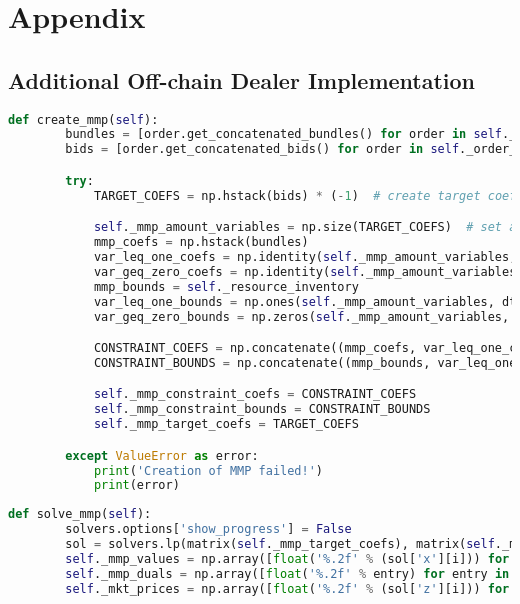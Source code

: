 \section{Appendix}

\subsection{Additional Off-chain Dealer Implementation}
\label{appendix:additional_offchain}

\begin{lstlisting}[float=htbp, label=lst:creation_mmp, caption=Creation of MMP, language=Python]
    def create_mmp(self):
        bundles = [order.get_concatenated_bundles() for order in self._order_handler.get_all_orders()]
        bids = [order.get_concatenated_bids() for order in self._order_handler.get_all_orders()]

        try:
            TARGET_COEFS = np.hstack(bids) * (-1)  # create target coef vector

            self._mmp_amount_variables = np.size(TARGET_COEFS)  # set amount of variables
            mmp_coefs = np.hstack(bundles)
            var_leq_one_coefs = np.identity(self._mmp_amount_variables, dtype=float)  # create constraint matrix for y<=1
            var_geq_zero_coefs = np.identity(self._mmp_amount_variables, dtype=float) * (-1)  # create constraint matrix for y>=0
            mmp_bounds = self._resource_inventory
            var_leq_one_bounds = np.ones(self._mmp_amount_variables, dtype=float)
            var_geq_zero_bounds = np.zeros(self._mmp_amount_variables, dtype=float)

            CONSTRAINT_COEFS = np.concatenate((mmp_coefs, var_leq_one_coefs, var_geq_zero_coefs), axis=0)  # create final constraint matrix
            CONSTRAINT_BOUNDS = np.concatenate((mmp_bounds, var_leq_one_bounds, var_geq_zero_bounds))  # create final bounds matrix

            self._mmp_constraint_coefs = CONSTRAINT_COEFS
            self._mmp_constraint_bounds = CONSTRAINT_BOUNDS
            self._mmp_target_coefs = TARGET_COEFS

        except ValueError as error:
            print('Creation of MMP failed!')
            print(error)
\end{lstlisting}

\begin{lstlisting}[float=htbp, label=lst:solving_mmp, caption=Solving of MMP, language=Python]
    def solve_mmp(self):
        solvers.options['show_progress'] = False
        sol = solvers.lp(matrix(self._mmp_target_coefs), matrix(self._mmp_constraint_coefs), matrix(self._mmp_constraint_bounds))
        self._mmp_values = np.array([float('%.2f' % (sol['x'][i])) for i in range(self._mmp_amount_variables)])
        self._mmp_duals = np.array([float('%.2f' % entry) for entry in sol['z']])
        self._mkt_prices = np.array([float('%.2f' % (sol['z'][i])) for i in range(self._shared_resource_size)])
\end{lstlisting}

\clearpage